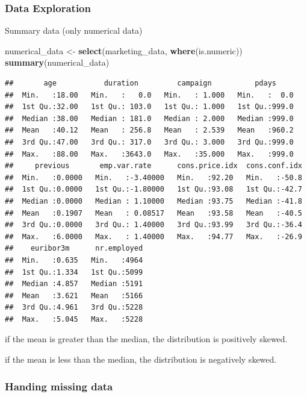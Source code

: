 \documentclass[
]{article}
\newenvironment{Shaded}{\begin{snugshade}}{\end{snugshade}}
\newcommand{\FunctionTok}[1]{\textcolor[rgb]{0.13,0.29,0.53}{\textbf{#1}}}
\newcommand{\NormalTok}[1]{#1}
\newcommand{\OtherTok}[1]{\textcolor[rgb]{0.56,0.35,0.01}{#1}}
\begin{document}
\subsubsection{\texorpdfstring{\textbf{Data
Exploration}}{Data Exploration}}\label{data-exploration}

Summary data (only numerical data)

\begin{Shaded}
\begin{Highlighting}[]
\NormalTok{numerical\_data }\OtherTok{\textless{}{-}} \FunctionTok{select}\NormalTok{(marketing\_data, }\FunctionTok{where}\NormalTok{(is.numeric))}
\FunctionTok{summary}\NormalTok{(numerical\_data)}
\end{Highlighting}
\end{Shaded}

\begin{verbatim}
##       age           duration         campaign          pdays      
##  Min.   :18.00   Min.   :   0.0   Min.   : 1.000   Min.   :  0.0  
##  1st Qu.:32.00   1st Qu.: 103.0   1st Qu.: 1.000   1st Qu.:999.0  
##  Median :38.00   Median : 181.0   Median : 2.000   Median :999.0  
##  Mean   :40.12   Mean   : 256.8   Mean   : 2.539   Mean   :960.2  
##  3rd Qu.:47.00   3rd Qu.: 317.0   3rd Qu.: 3.000   3rd Qu.:999.0  
##  Max.   :88.00   Max.   :3643.0   Max.   :35.000   Max.   :999.0  
##     previous       emp.var.rate      cons.price.idx  cons.conf.idx  
##  Min.   :0.0000   Min.   :-3.40000   Min.   :92.20   Min.   :-50.8  
##  1st Qu.:0.0000   1st Qu.:-1.80000   1st Qu.:93.08   1st Qu.:-42.7  
##  Median :0.0000   Median : 1.10000   Median :93.75   Median :-41.8  
##  Mean   :0.1907   Mean   : 0.08517   Mean   :93.58   Mean   :-40.5  
##  3rd Qu.:0.0000   3rd Qu.: 1.40000   3rd Qu.:93.99   3rd Qu.:-36.4  
##  Max.   :6.0000   Max.   : 1.40000   Max.   :94.77   Max.   :-26.9  
##    euribor3m      nr.employed  
##  Min.   :0.635   Min.   :4964  
##  1st Qu.:1.334   1st Qu.:5099  
##  Median :4.857   Median :5191  
##  Mean   :3.621   Mean   :5166  
##  3rd Qu.:4.961   3rd Qu.:5228  
##  Max.   :5.045   Max.   :5228
\end{verbatim}

if the mean is greater than the median, the distribution is positively
skewed.

if the mean is less than the median, the distribution is negatively
skewed.

\subsubsection{Handing missing data}\label{handing-missing-data}
\end{document}
